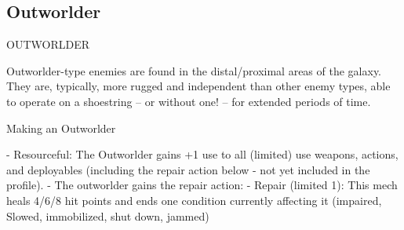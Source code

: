 \subsection{Outworlder}
                                            OUTWORLDER   

Outworlder-type enemies are found in the distal/proximal areas of the galaxy. They are, typically,  
more rugged and independent than other enemy types, able to operate on a shoestring -- or  
without one! -- for extended periods of time.  
 

Making an Outworlder
 

    -    Resourceful: The Outworlder gains +1 use to all (limited) use weapons, actions, and  
        deployables (including the repair action below - not yet included in the profile).  
    -   The outworlder gains the repair action:  
             -   Repair (limited 1): This mech heals 4/6/8 hit points and ends one condition  
                 currently affecting it (impaired, Slowed, immobilized, shut down, jammed)  

                                    